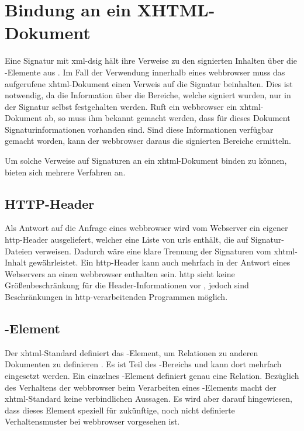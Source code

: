 
\chapter{Bindung an ein XHTML-Dokument}
\label{chap:Signaturbindung}
Eine Signatur mit \gls{xml-dsig} hält ihre Verweise zu den signierten Inhalten über die -Elemente aus .
Im Fall der Verwendung innerhalb eines \gls{webbrowser} muss das aufgerufene \gls{xhtml}-Dokument einen Verweis auf die Signatur beinhalten. Dies ist notwendig,
da die Information über die Bereiche, welche signiert wurden, nur in der Signatur selbst festgehalten werden. Ruft ein \gls{webbrowser} ein \gls{xhtml}-Dokument
ab, so muss ihm bekannt gemacht werden, dass für dieses Dokument Signaturinformationen vorhanden sind. Sind diese Informationen verfügbar gemacht worden, kann
der \gls{webbrowser} daraus die signierten Bereiche ermitteln.

Um solche Verweise auf Signaturen an ein \gls{xhtml}-Dokument binden zu können, bieten sich mehrere Verfahren an.

\section{HTTP-Header}
Als Antwort auf die Anfrage eines \gls{webbrowser} wird vom Webserver ein eigener \gls{http}-Header ausgeliefert, welcher eine Liste von \glspl{url} enthält, die auf
Signatur-Dateien verweisen. Dadurch wäre eine klare Trennung der Signaturen vom \gls{xhtml}-Inhalt gewährleistet.
Ein \gls{http}-Header kann auch mehrfach in der Antwort eines Webservers an einen \gls{webbrowser} enthalten sein. \gls{http} sieht keine Größenbeschränkung für
die Header-Informationen vor \cite{http:ietf}, jedoch sind Beschränkungen in \gls{http}-verarbeitenden Programmen möglich.



\section{-Element}
Der \gls{xhtml}-Standard definiert das -Element, um Relationen zu anderen Dokumenten zu definieren \cite{xhtml:oreilly}. Es ist Teil des
-Bereichs und kann dort mehrfach eingesetzt werden. Ein einzelnes -Element definiert genau eine Relation. Bezüglich des Verhaltens
der \gls{webbrowser} beim Verarbeiten eines -Elements macht der \gls{xhtml}-Standard keine verbindlichen Aussagen. Es wird aber darauf
hingewiesen, dass dieses Element speziell für zukünftige, noch nicht definierte Verhaltensmuster bei \gls{webbrowser} vorgesehen ist.

